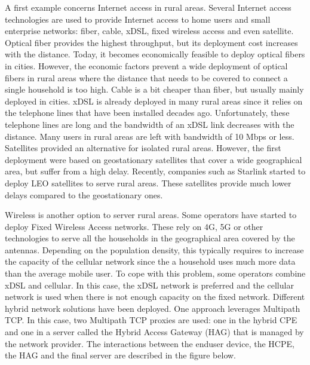 \documentclass[letterpaper,10pt,english]{sphinxmanual}
\begin{document}
\sphinxAtStartPar
A first example concerns Internet access in rural areas. Several Internet access technologies are used to provide Internet access to home users and small enterprise networks: fiber, cable, xDSL, fixed wireless access and even satellite. Optical fiber provides the highest throughput, but its deployment cost increases with the distance. Today, it becomes economically feasible to deploy optical fibers in cities. However, the economic factors prevent a wide deployment of optical fibers in rural areas where the distance that needs to be covered to connect a single household is too high. Cable is a bit cheaper than fiber, but usually mainly deployed in cities. xDSL is already deployed in many rural areas since it relies on the telephone lines that have been installed decades ago. Unfortunately, these telephone lines are long and the bandwidth of an xDSL link decreases with the distance. Many users in rural areas are left with bandwidth of 10 Mbps or less. Satellites provided an alternative for isolated rural areas. However, the first deployment were based on geostationary satellites that cover a wide geographical area, but suffer from a high delay. Recently, companies such as Starlink started to deploy LEO satellites to serve rural areas. These satellites provide much lower delays compared to the geostationary ones.

\sphinxAtStartPar
Wireless is another option to server rural areas. Some operators have started to deploy Fixed Wireless Access networks. These rely on 4G, 5G or other technologies to serve all the households in the geographical area covered by the antennas. Depending on the population density, this typically requires to increase the capacity of the cellular network since the a household uses much more data than the average mobile user. To cope with this problem, some operators combine xDSL and cellular. In this case, the xDSL network is preferred and the cellular network is used when there is not enough capacity on the fixed network. Different hybrid network solutions have been deployed. One approach leverages Multipath TCP. In this case, two Multipath TCP proxies are used: one in the hybrid CPE and one in a server called the Hybrid Access Gateway (HAG) that is managed by the network provider. The interactions between the enduser device, the HCPE, the HAG and the final server are described in the figure below.
\end{document}

